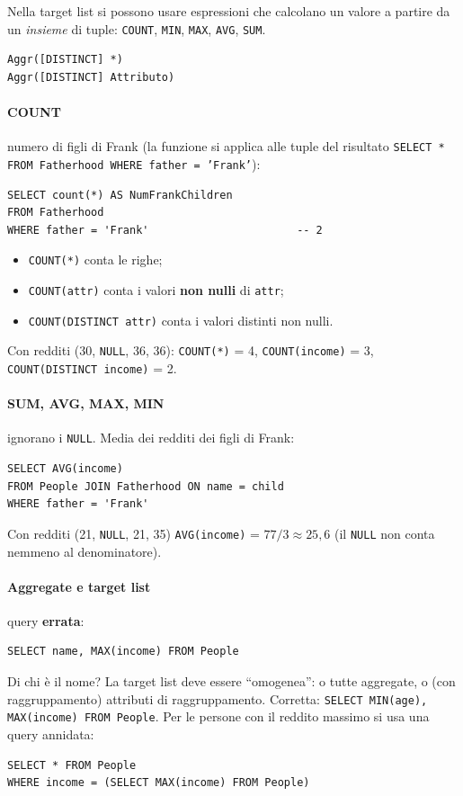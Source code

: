 \documentclass[a4paper,12pt]{article}
\begin{document}
Nella target list si possono usare espressioni che calcolano un valore a
partire da un \emph{insieme} di tuple: \texttt{COUNT}, \texttt{MIN},
\texttt{MAX}, \texttt{AVG}, \texttt{SUM}.
\begin{verbatim}
Aggr([DISTINCT] *)
Aggr([DISTINCT] Attributo)
\end{verbatim}

\paragraph{COUNT} numero di figli di Frank (la funzione si applica alle tuple
del risultato \texttt{SELECT * FROM Fatherhood WHERE father = 'Frank'}):
\begin{verbatim}
SELECT count(*) AS NumFrankChildren
FROM Fatherhood
WHERE father = 'Frank'                       -- 2
\end{verbatim}
\begin{itemize}
  \item \texttt{COUNT(*)} conta le righe;
  \item \texttt{COUNT(attr)} conta i valori \textbf{non nulli} di
    \texttt{attr};
  \item \texttt{COUNT(DISTINCT attr)} conta i valori distinti non nulli.
\end{itemize}
Con redditi (30, \texttt{NULL}, 36, 36): \texttt{COUNT(*)} = 4,
\texttt{COUNT(income)} = 3, \texttt{COUNT(DISTINCT income)} = 2.

\paragraph{SUM, AVG, MAX, MIN} ignorano i \texttt{NULL}. Media dei redditi dei
figli di Frank:
\begin{verbatim}
SELECT AVG(income)
FROM People JOIN Fatherhood ON name = child
WHERE father = 'Frank'
\end{verbatim}
Con redditi (21, \texttt{NULL}, 21, 35) \texttt{AVG(income)} = $77/3 \approx
25{,}6$ (il \texttt{NULL} non conta nemmeno al denominatore).

\paragraph{Aggregate e target list} query \textbf{errata}:
\begin{verbatim}
SELECT name, MAX(income) FROM People
\end{verbatim}
Di chi è il nome? La target list deve essere ``omogenea'': o tutte aggregate,
o (con raggruppamento) attributi di raggruppamento. Corretta:
\texttt{SELECT MIN(age), MAX(income) FROM People}. Per le persone con il
reddito massimo si usa una query annidata:
\begin{verbatim}
SELECT * FROM People
WHERE income = (SELECT MAX(income) FROM People)
\end{verbatim}
\end{document}
